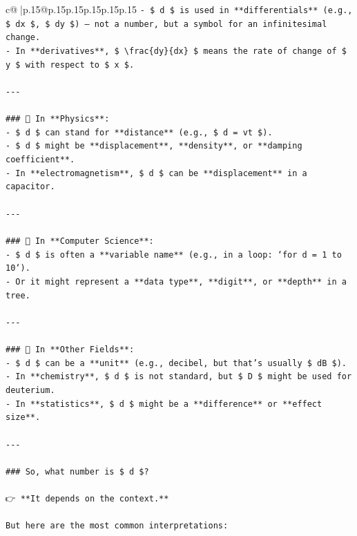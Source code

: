 \documentclass{article}
\begin{document}
{\begin{supertabular}{c@{$\;$}|p{.15\linewidth}@{}p{.15\linewidth}p{.15\linewidth}p{.15\linewidth}p{.15\linewidth}p{.15\linewidth}}
{{{\texttt{{-} \$ d \$ is used in **differentials** (e.g., \$ dx \$, \$ dy \$) — not a number, but a symbol for an infinitesimal change.} \\
\texttt{{-} In **derivatives**, \$ \textbackslash{}frac\{dy\}\{dx\} \$ means the rate of change of \$ y \$ with respect to \$ x \$.} \\
\\ 
\texttt{{-}{-}{-}} \\
\\ 
\texttt{\#\#\# 🔹 In **Physics**:} \\
\texttt{{-} \$ d \$ can stand for **distance** (e.g., \$ d = vt \$).} \\
\texttt{{-} \$ d \$ might be **displacement**, **density**, or **damping coefficient**.} \\
\texttt{{-} In **electromagnetism**, \$ d \$ can be **displacement** in a capacitor.} \\
\\ 
\texttt{{-}{-}{-}} \\
\\ 
\texttt{\#\#\# 🔹 In **Computer Science**:} \\
\texttt{{-} \$ d \$ is often a **variable name** (e.g., in a loop: `for d = 1 to 10`).} \\
\texttt{{-} Or it might represent a **data type**, **digit**, or **depth** in a tree.} \\
\\ 
\texttt{{-}{-}{-}} \\
\\ 
\texttt{\#\#\# 🔹 In **Other Fields**:} \\
\texttt{{-} \$ d \$ can be a **unit** (e.g., decibel, but that's usually \$ dB \$).} \\
\texttt{{-} In **chemistry**, \$ d \$ is not standard, but \$ D \$ might be used for deuterium.} \\
\texttt{{-} In **statistics**, \$ d \$ might be a **difference** or **effect size**.} \\
\\ 
\texttt{{-}{-}{-}} \\
\\ 
\texttt{\#\#\# So, what number is \$ d \$?} \\
\\ 
\texttt{👉 **It depends on the context.**} \\
\\ 
\texttt{But here are the most common interpretations:} \\
\\ 
}}}
\end{supertabular}}
\end{document}
